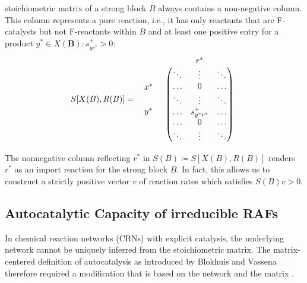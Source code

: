 \documentclass[pdflatex]{sn-jnl}
\theoremstyle{thmstyleone}%
\theoremstyle{examplesty}%
\theoremstyle{thmstylethree}%
\newcommand{\SM}{S}
\newcommand{\block}[0]{\mathbf{B}}
\begin{document}
stoichiometric matrix of a strong block $B$ always contains a non-negative
column. This column represents a pure reaction, i.e., it has only reactants
that are F-catalysts but not F-reactants within $B$ and at least one
positive entry for a product $y^*\in X(\block): s^+_{yr^*}>0$:
\begin{equation}
  \SM[X(B), R(B)] = 
  \begin{array}{c c}
    & 	\begin{array}{c c c} 			
	  & 	r^* 		& 
	\end{array} \\
    \begin{array}{c} 
      \ \\ 
      x^* \\
      \ \\ [0.5em]
      y^* \\
      \ \\
      \ \\		
    \end{array}
    & \begin{pmatrix}						
	\ddots 	& 	\vdots 	& \ddots \\
	\ldots 	& 	0 		& \ldots \\
	\ddots 	& 	\vdots 	& \ddots \\
	\ldots 	& 	s^+_{y^*r^*} & \ldots \\
	\ldots 	& 	0 & \ldots \\
	\ddots 	& 	\vdots 	& \ddots 
      \end{pmatrix}
  \end{array}
\end{equation}
\vspace{6pt}

The nonnegative column reflecting $r^*$ in $\SM(B)\coloneqq \SM[X(B),
  R(B)]$ renders $r^*$ as an import reaction for the strong block $B$. In
fact, this allows us to construct a strictly positive vector $v$ of
reaction rates which satisfies $\SM(B)v>0$.

\subsection{Autocatalytic Capacity of irreducible RAFs}
\label{sec:AutoCatIrrRAF}

In chemical reaction networks (CRNs) with explicit catalysis, the underlying network cannot be uniquely 
inferred from the stoichiometric matrix. The matrix-centered definition of autocatalysis as introduced by Blokhuis 
\cite{blokhuis_Universal_2020} and Vassena \cite{vassena_unstable_2024} therefore required 
a modification that is based on the network and the matrix \cite{golnik_autocatalytic_2026}.
\end{document}

